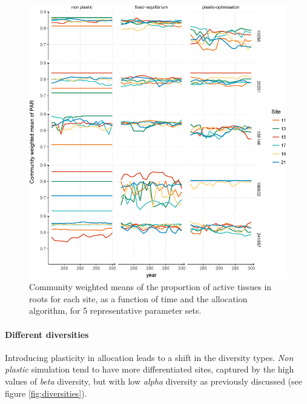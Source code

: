 

\begin{figure}%
    \includegraphics[width=1\linewidth]{./2_PP/Figures/Comm/comm_variability_lines.png}%
  \caption[Spatial and temporal variability of the CWMs of the PAR]{Community weighted means of the proportion of active tissues in roots for each site, as a function of time and the allocation algorithm, for 5 representative parameter sets.}
  \label{fig:comm_strat}
\end{figure}


\paragraph{Different diversities}

Introducing plasticity in allocation leads to a shift in the diversity types. \textit{Non plastic} simulation tend to have more differentiated sites, captured by the high values of \textit{beta} diversity, but with low \textit{alpha} diversity as previously discussed (see figure \ref{fig:diversities}). 

